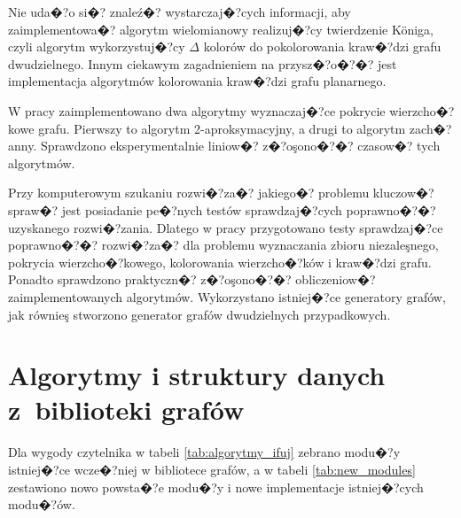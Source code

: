\documentclass[12pt,a4paper]{mwrep}
\begin{document}
Nie uda�?o si�? znaleź�? wystarczaj�?cych informacji, aby zaimplementowa�?
algorytm wielomianowy realizuj�?cy twierdzenie K\"{o}niga, czyli algorytm
wykorzystuj�?cy $\Delta$ kolorów do pokolorowania kraw�?dzi grafu dwudzielnego.
Innym ciekawym zagadnieniem na przysz�?o�?�? jest implementacja
algorytmów kolorowania kraw�?dzi grafu planarnego.

W pracy zaimplementowano dwa algorytmy wyznaczaj�?ce pokrycie
wierzcho�?kowe grafu. Pierwszy to algorytm 2-aproksymacyjny,
a drugi to algorytm zach�?anny. Sprawdzono eksperymentalnie
liniow�? z�?oşono�?�? czasow�? tych algorytmów.

Przy komputerowym szukaniu rozwi�?za�? jakiego�? problemu
kluczow�? spraw�? jest posiadanie pe�?nych testów sprawdzaj�?cych
poprawno�?�? uzyskanego rozwi�?zania. Dlatego w pracy przygotowano
testy sprawdzaj�?ce poprawno�?�? rozwi�?za�? dla problemu 
wyznaczania zbioru niezaleşnego, pokrycia wierzcho�?kowego,
kolorowania wierzcho�?ków i kraw�?dzi grafu.
Ponadto sprawdzono praktyczn�? z�?oşono�?�? obliczeniow�?
zaimplementowanych algorytmów.
Wykorzystano istniej�?ce generatory grafów, jak równieş
stworzono generator grafów dwudzielnych przypadkowych.




\appendix

\chapter{Algorytmy i struktury danych z~biblioteki grafów}
\label{app:biblioteka_grafow}

Dla wygody czytelnika w tabeli \ref{tab:algorytmy_ifuj}
zebrano modu�?y istniej�?ce wcze�?niej w bibliotece grafów,
a w tabeli \ref{tab:new_modules} zestawiono nowo powsta�?e modu�?y
i nowe implementacje istniej�?cych modu�?ów.
\end{document}
